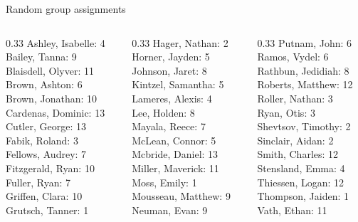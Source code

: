 \documentclass[10pt]{beamer}
\begin{document}
\begin{frame}{Random group assignments}
\begin{columns}
\begin{column}{0.33\textwidth}
Ashley, Isabelle: 4 \\ 
Bailey, Tanna: 9 \\ 
Blaisdell, Olyver: 11 \\ 
Brown, Ashton: 6 \\ 
Brown, Jonathan: 10 \\ 
Cardenas, Dominic: 13 \\ 
Cutler, George: 13 \\ 
Fabik, Roland: 3 \\ 
Fellows, Audrey: 7 \\ 
Fitzgerald, Ryan: 10 \\ 
Fuller, Ryan: 7 \\ 
Griffen, Clara: 10 \\ 
Grutsch, Tanner: 1 \\\end{column}
\begin{column}{0.33\textwidth}
Hager, Nathan: 2 \\ 
Horner, Jayden: 5 \\ 
Johnson, Jaret: 8 \\ 
Kintzel, Samantha: 5 \\ 
Lameres, Alexis: 4 \\ 
Lee, Holden: 8 \\ 
Mayala, Reece: 7 \\ 
McLean, Connor: 5 \\ 
Mcbride, Daniel: 13 \\ 
Miller, Maverick: 11 \\ 
Moss, Emily: 1 \\ 
Mousseau, Matthew: 9 \\ 
Neuman, Evan: 9 \\\end{column}
\begin{column}{0.33\textwidth}
Putnam, John: 6 \\ 
Ramos, Vydel: 6 \\ 
Rathbun, Jedidiah: 8 \\ 
Roberts, Matthew: 12 \\ 
Roller, Nathan: 3 \\ 
Ryan, Otis: 3 \\ 
Shevtsov, Timothy: 2 \\ 
Sinclair, Aidan: 2 \\ 
Smith, Charles: 12 \\ 
Stensland, Emma: 4 \\ 
Thiessen, Logan: 12 \\ 
Thompson, Jaiden: 1 \\ 
Vath, Ethan: 11 \\\end{column}
\end{columns}
\end{frame}
\end{document}

